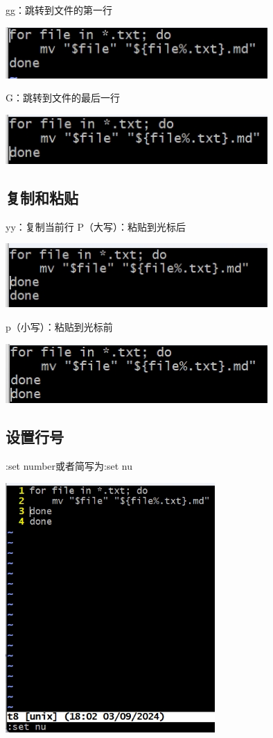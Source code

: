 \documentclass[UTF8,a4paper]{ctexart}
\begin{document}
\begin{sloppypar}
	gg：跳转到文件的第一行
	
	\includegraphics[width = 10cm]{52}
	
	G：跳转到文件的最后一行
	
	\includegraphics[width = 10cm]{53}
	
	\subsection{复制和粘贴}
	yy：复制当前行
	P（大写）：粘贴到光标后
	
	\includegraphics[width = 10cm]{55}
	
	p（小写）：粘贴到光标前
	
	\includegraphics[width = 10cm]{54}
	
	\subsection{设置行号}
	:set number或者简写为:set nu
	
	\includegraphics[width = 8cm]{56}
	

\end{sloppypar}
\end{document}
